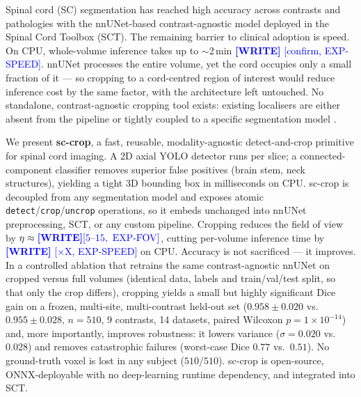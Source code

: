 \documentclass[11pt]{article}
\newcommand{\WRITE}[1]{\textcolor{blue}{\textbf{[WRITE]} #1}}
\begin{document}
Spinal cord (SC) segmentation has reached high accuracy across contrasts and
pathologies with the nnUNet-based contrast-agnostic model deployed in the Spinal
Cord Toolbox (SCT). The remaining barrier to clinical adoption is speed. On CPU,
whole-volume inference takes up to $\sim$2\,min \WRITE{[confirm, EXP-SPEED]}.
nnUNet processes the entire volume, yet the cord occupies only a small fraction
of it --- so cropping to a cord-centred region of interest would reduce inference
cost by the same factor, with the architecture left untouched. No standalone,
contrast-agnostic cropping tool exists: existing localisers are either absent
from the pipeline \cite{bedard2025media} or tightly coupled to a specific
segmentation model \cite{lemay2021tumor, gros2021tumor}.

We present \textbf{sc-crop}, a fast, reusable, modality-agnostic detect-and-crop
primitive for spinal cord imaging. A 2D axial YOLO detector runs per slice; a
connected-component classifier removes superior false positives (brain stem, neck
structures), yielding a tight 3D bounding box in milliseconds on CPU. sc-crop is
decoupled from any segmentation model and exposes atomic
\texttt{detect}/\texttt{crop}/\texttt{uncrop} operations, so it embeds unchanged
into nnUNet preprocessing, SCT, or any custom pipeline. Cropping reduces the
field of view by $\eta\approx\WRITE{[5\text{--}15,~\text{EXP-FOV}]}$, cutting
per-volume inference time by \WRITE{[$\times$X, EXP-SPEED]} on CPU. Accuracy is
not sacrificed --- it improves. In a controlled ablation that retrains the same
contrast-agnostic nnUNet on cropped versus full volumes (identical data, labels
and train/val/test split, so that only the crop differs), cropping yields a small
but highly significant Dice gain on a frozen, multi-site, multi-contrast held-out
set ($0.958\pm0.020$ vs.\ $0.955\pm0.028$, $n=510$, 9 contrasts, 14 datasets,
paired Wilcoxon $p=1\times10^{-14}$) and, more importantly, improves robustness:
it lowers variance ($\sigma=0.020$ vs.\ $0.028$) and removes catastrophic failures
(worst-case Dice $0.77$ vs.\ $0.51$). No ground-truth voxel is lost in any subject
($510/510$). sc-crop is open-source,
ONNX-deployable with no deep-learning runtime dependency, and integrated into
SCT.
\end{document}
